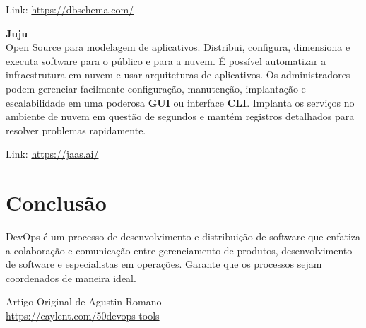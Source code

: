 \documentclass[fleqn,10pt]{../sty/SelfArx} %
\begin{document}
Link: \url{https://dbschema.com/}

\textbf{Juju} \\
Open Source para modelagem de aplicativos. Distribui, configura, dimensiona e executa software para o público e para a nuvem. É possível automatizar a infraestrutura em nuvem e usar arquiteturas de aplicativos. Os administradores podem gerenciar facilmente configuração, manutenção, implantação e escalabilidade em uma poderosa \textbf{GUI} ou interface \textbf{CLI}. Implanta os serviços no ambiente de nuvem em questão de segundos e mantém registros detalhados para resolver problemas rapidamente.

Link: \url{https://jaas.ai/}

\section*{Conclusão}

DevOps é um processo de desenvolvimento e distribuição de software que enfatiza a colaboração e comunicação entre gerenciamento de produtos, desenvolvimento de software e especialistas em operações. Garante que os processos sejam coordenados de maneira ideal.



\begin{thebibliography}{4}
	Artigo Original de Agustin Romano \\
	\url{https://caylent.com/50devops-tools}
	
	
\end{thebibliography}
\end{document}
